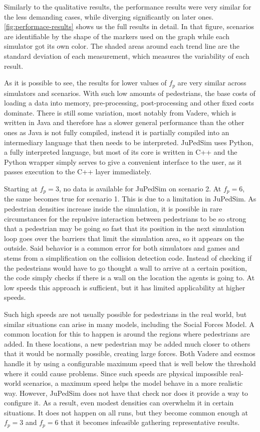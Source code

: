 \documentclass[twoside, 11pt]{article}
\begin{document}
Similarly to the qualitative results, the performance results were very similar for the less demanding cases, while diverging significantly on later ones. \autoref{fig:performace-results} shows us the full results in detail. In that figure, scenarios are identifiable by the shape of the markers used on the graph while each simulator got its own color. The shaded areas around each trend line are the standard deviation of each measurement, which measures the variability of each result.

As it is possible to see, the results for lower values of $f_p$ are very similar across simulators and scenarios. With such low amounts of pedestrians, the base costs of loading a data into memory, pre-processing, post-processing and other fixed costs dominate. There is still some variation, most notably from Vadere, which is written in Java and therefore has a slower general performance than the other ones as Java is not fully compiled, instead it is partially compiled into an intermediary language that then needs to be interpreted. JuPedSim uses Python, a fully interpreted language, but most of its core is written in C++ and the Python wrapper simply serves to give a convenient interface to the user, as it passes execution to the C++ layer immediately.

Starting at $f_p = 3$, no data is available for JuPedSim on scenario 2. At $f_p = 6$, the same becomes true for scenario 1. This is due to a limitation in JuPedSim. As pedestrian densities increase inside the simulation, it is possible in rare circumstances for the repulsive interaction between pedestrians to be so strong that a pedestrian may be going so fast that its position in the next simulation loop goes over the barriers that limit the simulation area, so it appears on the outside. Said behavior is a common error for both simulators and games and stems from a simplification on the collision detection code. Instead of checking if the pedestrians would have to go thought a wall to arrive at a certain position, the code simply checks if there is a wall on the location the agents is going to. At low speeds this approach is sufficient, but it has limited applicability at higher speeds.

Such high speeds are not usually possible for pedestrians in the real world, but similar situations can arise in many models, including the Social Forces Model. A common location for this to happen is around the regions where pedestrians are added. In these locations, a new pedestrian may be added much closer to others that it would be normally possible, creating large forces. Both Vadere and \gls{ecsmos} handle it by using a configurable maximum speed that is well below the threshold where it could cause problems. Since such speeds are physical impossible real-world scenarios, a maximum speed helps the model behave in a more realistic way. However, JuPedSim does not have that check nor does it provide a way to configure it. As a result, even modest densities can overwhelm it in certain situations. It does not happen on all runs, but they become common enough at $f_p = 3$ and $f_p = 6$ that it becomes infeasible gathering representative results.
\end{document}
